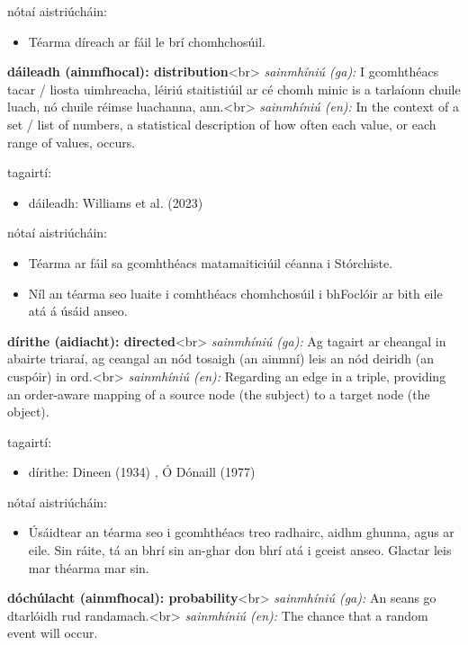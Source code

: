 \documentclass{article}
\begin{document}
nótaí aistriúcháin:
\begin{itemize}
	\item Téarma díreach ar fáil le brí chomhchosúil.
\end{itemize}


\textbf{dáileadh (ainmfhocal): distribution}<br>
\textit{sainmhíniú (ga):} I gcomhthéacs tacar / liosta uimhreacha, léiriú staitistiúil ar cé chomh minic is a tarlaíonn chuile luach, nó chuile réimse luachanna, ann.<br>
\textit{sainmhíniú (en):} In the context of a set / list of numbers, a statistical description of how often each value, or each range of values, occurs.

tagairtí:
\begin{itemize}
	\item dáileadh: Williams et al. (2023) \cite{storchiste}
\end{itemize}

nótaí aistriúcháin:
\begin{itemize}
	\item Téarma ar fáil sa gcomhthéacs matamaiticiúil céanna i Stórchiste.
	\item Níl an téarma seo luaite i comhthéacs chomhchosúil i bhFoclóir ar bith eile atá á úsáid anseo.
\end{itemize}


\textbf{dírithe (aidiacht): directed}<br>
\textit{sainmhíniú (ga):} Ag tagairt ar cheangal in abairte triaraí, ag ceangal an nód tosaigh (an ainmní) leis an nód deiridh (an cuspóir) in ord.<br>
\textit{sainmhíniú (en):} Regarding an edge in a triple, providing an order-aware mapping of a source node (the subject) to a target node (the object).

tagairtí:
\begin{itemize}
	\item dírithe: Dineen (1934) \cite{dineen}, Ó Dónaill (1977) \cite{odonaill}
\end{itemize}

nótaí aistriúcháin:
\begin{itemize}
	\item Úsáidtear an téarma seo i gcomhthéacs treo radhairc, aidhm ghunna, agus ar eile. Sin ráite, tá an bhrí sin an-ghar don bhrí atá i gceist anseo. Glactar leis mar théarma mar sin.
\end{itemize}


\textbf{dóchúlacht (ainmfhocal): probability}<br>
\textit{sainmhíniú (ga):} An seans go dtarlóidh rud randamach.<br>
\textit{sainmhíniú (en):} The chance that a random event will occur.
\end{document}
